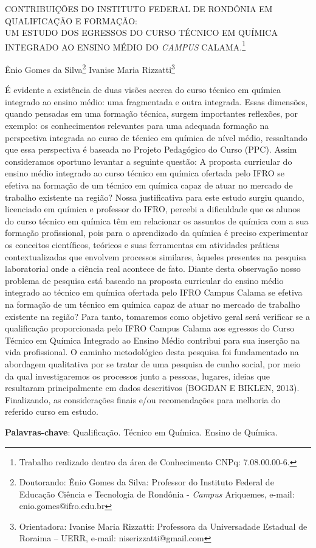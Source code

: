 \documentclass[article,12pt,onesidea,4paper,english,brazil]{abntex2}
\begin{document}
	
	
	\frenchspacing 
	
	\begin{center}
		\LARGE CONTRIBUIÇÕES DO INSTITUTO FEDERAL DE RONDÔNIA EM QUALIFICAÇÃO E FORMAÇÃO:\\
		UM ESTUDO DOS EGRESSOS DO CURSO TÉCNICO EM QUÍMICA INTEGRADO AO ENSINO MÉDIO DO \textit{CAMPUS} CALAMA.\footnote{Trabalho realizado dentro da área de Conhecimento CNPq: 7.08.00.00-6.}
		
		\normalsize
		Ênio Gomes da Silva\footnote{Doutorando: Ênio Gomes da Silva: Professor do Instituto Federal de Educação Ciência e Tecnologia de Rondônia - \textit{Campus} Ariquemes, e-mail: enio.gomes@ifro.edu.br} 
		Ivanise Maria Rizzatti\footnote{Orientadora: Ivanise Maria Rizzatti: Professora da Universadade Estadual de Roraima – UERR, e-mail: niserizzatti@gmail.com} 
	\end{center}
	
	\noindent É evidente a existência de duas visões acerca do curso técnico em química integrado ao
	ensino médio: uma fragmentada e outra integrada. Essas dimensões, quando pensadas em
	uma formação técnica, surgem importantes reflexões, por exemplo: os conhecimentos
	relevantes para uma adequada formação na perspectiva integrada ao curso de técnico em
	química de nível médio, ressaltando que essa perspectiva é baseada no Projeto Pedagógico
	do Curso (PPC). Assim consideramos oportuno levantar a seguinte questão: A proposta
	curricular do ensino médio integrado ao curso técnico em química ofertada pelo IFRO se
	efetiva na formação de um técnico em química capaz de atuar no mercado de trabalho
	existente na região? Nossa justificativa para este estudo surgiu quando, licenciado em
	química e professor do IFRO, percebi a dificuldade que os alunos do curso técnico em
	química têm em relacionar os assuntos de química com a sua formação profissional, pois
	para o aprendizado da química é preciso experimentar os conceitos científicos, teóricos e
	suas ferramentas em atividades práticas contextualizadas que envolvem processos
	similares, àqueles presentes na pesquisa laboratorial onde a ciência real acontece de fato.
	Diante desta observação nosso problema de pesquisa está baseado na proposta curricular
	do ensino médio integrado ao técnico em química ofertada pelo IFRO Campus Calama se
	efetiva na formação de um técnico em química capaz de atuar no mercado de trabalho
	existente na região? Para tanto, tomaremos como objetivo geral será verificar se a
	qualificação proporcionada pelo IFRO Campus Calama aos egressos do Curso Técnico em
	Química Integrado ao Ensino Médio contribui para sua inserção na vida profissional. O
	caminho metodológico desta pesquisa foi fundamentado na abordagem qualitativa por se
	tratar de uma pesquisa de cunho social, por meio da qual investigaremos os processos junto
	a pessoas, lugares, ideias que resultaram principalmente em dados descritivos (BOGDAN E
	BIKLEN, 2013). Finalizando, as considerações finais e/ou recomendações para melhoria do
	referido curso em estudo.
	
	\vspace{\onelineskip}
	
	\noindent
	\textbf{Palavras-chave}: Qualificação. Técnico em Química. Ensino de Química.
	
\end{document}

